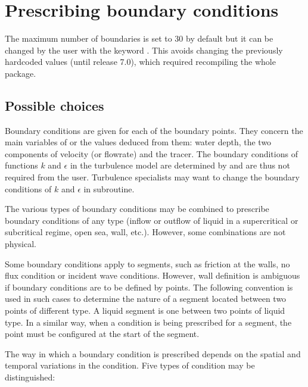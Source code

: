 \section{Prescribing boundary conditions}
\label{sec:presc:bc}

The maximum number of boundaries is set to 30 by default but it can be changed
by the user with the keyword .
This avoids changing the previously hardcoded values (until release 7.0),
which required recompiling the whole package.

\subsection{Possible choices}

Boundary conditions are given for each of the boundary points.
They concern the main variables of  or the values deduced from them:
water depth, the two components of velocity (or flowrate) and the tracer.
The boundary conditions of functions $k$ and $\epsilon$ in the turbulence model
are determined by  and are thus not required from the user.
Turbulence specialists may want to change the boundary conditions of $k$
and $\epsilon$ in  subroutine.

The various types of boundary conditions may be combined to prescribe boundary
conditions of any type (inflow or outflow of liquid in a supercritical or
subcritical regime, open sea, wall, etc.).
However, some combinations are not physical.

Some boundary conditions apply to segments, such as friction at the walls,
no flux condition or incident wave conditions.
However, wall definition is ambiguous if boundary conditions are to be defined
by points.
The following convention is used in such cases to determine the nature of a
segment located between two points of different type.
A liquid segment is one between two points of liquid type.
In a similar way, when a condition is being prescribed for a segment,
the point must be configured at the start of the segment.

The way in which a boundary condition is prescribed depends on the spatial
and temporal variations in the condition.
Five types of condition may be distinguished:

